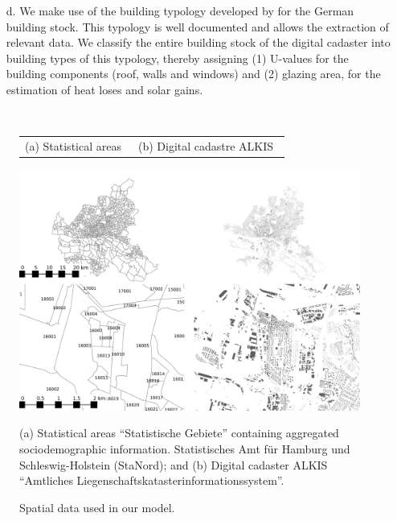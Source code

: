 \documentclass[11pt]{IJM-article}
\begin{document}
\begin{enumerate}
        contains a lot of information on the building stock of the city.  Each
        building is geo-referenced and contains a set of attributes.  From
        these attributes we use both the geo-reference (to estimate living
        space and building orientation) and the attributes to estimate energy
        relevant properties of the individual buildings, through the use of a
        building typology (see d below). See Figure~\ref{fig:2b}b for the
        buildings recorded in the digital cadaster of Hamburg.
    \item[d.] We make use of the building typology developed by
         for the German building stock. This typology is well
        documented and allows the extraction of relevant data. We classify the
        entire building stock of the digital cadaster into building types of
        this typology, thereby assigning (1) U-values for the building
        components (roof, walls and windows) and (2) glazing area, for the
        estimation of heat loses and solar gains.
\end{enumerate}\\

\begin{figure}[htb]
    \caption{Spatial data used in our model.}\label{fig:2}
    \centering
    \vspace{2ex}
    \begin{tabular}{p{}p{}}
        (a) Statistical areas~\label{fig:2a} & 
        (b) Digital cadastre ALKIS~\label{fig:2b}\\
    \end{tabular}
    \includegraphics[width=\textwidth]{FIGURES/Data.jpg}
    \begin{flushleft}
    \begin{footnotesize}
(a) Statistical areas ``Statistische Gebiete'' containing aggregated
sociodemographic information. Statistisches Amt für Hamburg und
Schleswig-Holstein (StaNord); and (b) Digital cadaster ALKIS ``Amtliches
Liegenschaftskatasterinformationssystem''. 
    \end{footnotesize}
    \end{flushleft}
\end{figure}
\end{document}
